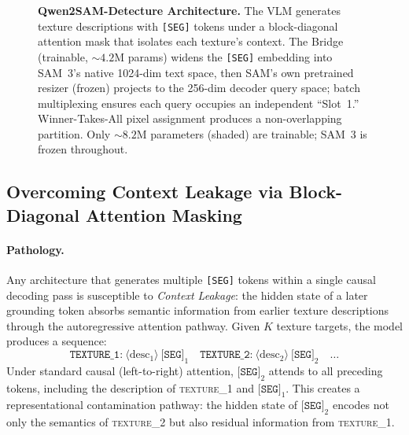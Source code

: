 \documentclass{article}
\begin{document}
\begin{figure}[t]
    \centering
    \caption{\textbf{Qwen2SAM-Detecture Architecture.} The VLM generates texture descriptions with \texttt{[SEG]} tokens under a block-diagonal attention mask that isolates each texture's context. The Bridge (trainable, $\sim 4.2$M params) widens the \texttt{[SEG]} embedding into SAM~3's native 1024-dim text space, then SAM's own pretrained resizer (frozen) projects to the 256-dim decoder query space; batch multiplexing ensures each query occupies an independent ``Slot~1.'' Winner-Takes-All pixel assignment produces a non-overlapping partition. Only ${\sim}8.2$M parameters (shaded) are trainable; SAM~3 is frozen throughout.}
    \label{fig:architecture}
\end{figure}

\subsection{Overcoming Context Leakage via Block-Diagonal Attention Masking}
\label{sec:context_leakage}

\paragraph{Pathology.}
Any architecture that generates multiple \texttt{[SEG]} tokens within a single causal decoding pass is susceptible to \emph{Context Leakage}: the hidden state of a later grounding token absorbs semantic information from earlier texture descriptions through the autoregressive attention pathway. Given $K$ texture targets, the model produces a sequence:
\begin{equation}
    \texttt{TEXTURE\_1:}~\langle \text{desc}_1 \rangle~\texttt{[SEG]}_1 \quad \texttt{TEXTURE\_2:}~\langle \text{desc}_2 \rangle~\texttt{[SEG]}_2 \quad \ldots
\end{equation}
Under standard causal (left-to-right) attention, $\texttt{[SEG]}_2$ attends to all preceding tokens, including the description of \textsc{texture\_1} and $\texttt{[SEG]}_1$. This creates a representational contamination pathway: the hidden state of $\texttt{[SEG]}_2$ encodes not only the semantics of \textsc{texture\_2} but also residual information from \textsc{texture\_1}.
\end{document}
